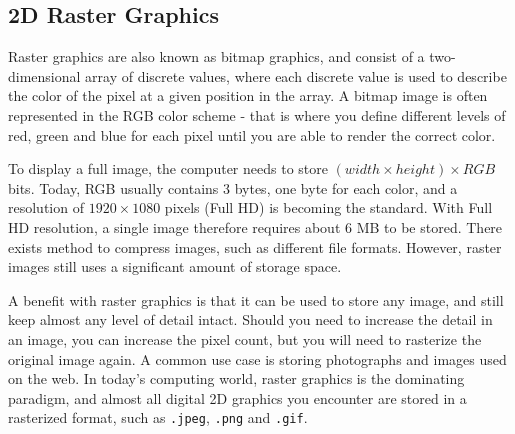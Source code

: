\subsection{2D Raster Graphics}
Raster graphics are also known as bitmap graphics, and consist of a two-dimensional array of discrete values, where each discrete value is used to describe the color of the pixel at a given position in the array.
A bitmap image is often represented in the RGB color scheme - that is where you define different levels of red, green and blue for each pixel until you are able to render the correct color.

To display a full image, the computer needs to store \( (width \times height) \times RGB \) bits.
Today, RGB usually contains 3 bytes, one byte for each color, and a resolution of \(1920 \times 1080\) pixels (Full HD) is becoming the standard.
With Full HD resolution, a single image therefore requires about 6 MB to be stored.
There exists method to compress images, such as different file formats.
However, raster images still uses a significant amount of storage space.

A benefit with raster graphics is that it can be used to store any image, and still keep almost any level of detail intact.
Should you need to increase the detail in an image, you can increase the pixel count, but you will need to rasterize the original image again.
A common use case is storing photographs and images used on the web.
In today's computing world, raster graphics is the dominating paradigm, and almost all digital 2D graphics you encounter are stored in a rasterized format, such as \texttt{.jpeg}, \texttt{.png} and \texttt{.gif}.
